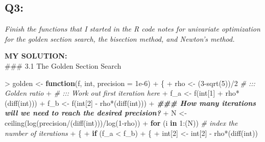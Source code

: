 \documentclass[
]{article}
\newenvironment{Shaded}{\begin{snugshade}}{\end{snugshade}}
\newcommand{\AttributeTok}[1]{\textcolor[rgb]{0.77,0.63,0.00}{#1}}
\newcommand{\CommentTok}[1]{\textcolor[rgb]{0.56,0.35,0.01}{\textit{#1}}}
\newcommand{\ControlFlowTok}[1]{\textcolor[rgb]{0.13,0.29,0.53}{\textbf{#1}}}
\newcommand{\DecValTok}[1]{\textcolor[rgb]{0.00,0.00,0.81}{#1}}
\newcommand{\DocumentationTok}[1]{\textcolor[rgb]{0.56,0.35,0.01}{\textbf{\textit{#1}}}}
\newcommand{\FloatTok}[1]{\textcolor[rgb]{0.00,0.00,0.81}{#1}}
\newcommand{\FunctionTok}[1]{\textcolor[rgb]{0.00,0.00,0.00}{#1}}
\newcommand{\NormalTok}[1]{#1}
\newcommand{\OtherTok}[1]{\textcolor[rgb]{0.56,0.35,0.01}{#1}}
\newcommand{\SpecialCharTok}[1]{\textcolor[rgb]{0.00,0.00,0.00}{#1}}
\begin{document}
\hypertarget{q3}{%
\subsection{Q3:}\label{q3}}

\emph{Finish the functions that I started in the R code notes for
univariate optimization for the golden section search, the bisection
method, and Newton's method.}

\textbf{MY SOLUTION:}\\
\#\#\# 3.1 The Golden Section Search

\begin{Shaded}
\begin{Highlighting}[]
\SpecialCharTok{\textgreater{}}\NormalTok{ golden }\OtherTok{\textless{}{-}} \ControlFlowTok{function}\NormalTok{(f, int, }\AttributeTok{precision =} \FloatTok{1e{-}6}\NormalTok{)}
\SpecialCharTok{+}\NormalTok{ \{}
\SpecialCharTok{+}\NormalTok{   rho }\OtherTok{\textless{}{-}}\NormalTok{ (}\DecValTok{3}\SpecialCharTok{{-}}\FunctionTok{sqrt}\NormalTok{(}\DecValTok{5}\NormalTok{))}\SpecialCharTok{/}\DecValTok{2} \CommentTok{\# ::: Golden ratio}
\SpecialCharTok{+}   \CommentTok{\# ::: Work out first iteration here}
\SpecialCharTok{+}\NormalTok{   f\_a }\OtherTok{\textless{}{-}} \FunctionTok{f}\NormalTok{(int[}\DecValTok{1}\NormalTok{] }\SpecialCharTok{+}\NormalTok{ rho}\SpecialCharTok{*}\NormalTok{(}\FunctionTok{diff}\NormalTok{(int)))}
\SpecialCharTok{+}\NormalTok{   f\_b }\OtherTok{\textless{}{-}} \FunctionTok{f}\NormalTok{(int[}\DecValTok{2}\NormalTok{] }\SpecialCharTok{{-}}\NormalTok{ rho}\SpecialCharTok{*}\NormalTok{(}\FunctionTok{diff}\NormalTok{(int)))}
\SpecialCharTok{+}   \DocumentationTok{\#\#\# How many iterations will we need to reach the desired precision?}
\SpecialCharTok{+}\NormalTok{   N }\OtherTok{\textless{}{-}} \FunctionTok{ceiling}\NormalTok{(}\FunctionTok{log}\NormalTok{(precision}\SpecialCharTok{/}\NormalTok{(}\FunctionTok{diff}\NormalTok{(int)))}\SpecialCharTok{/}\FunctionTok{log}\NormalTok{(}\DecValTok{1}\SpecialCharTok{{-}}\NormalTok{rho))}
\SpecialCharTok{+}   \ControlFlowTok{for}\NormalTok{ (i }\ControlFlowTok{in} \DecValTok{1}\SpecialCharTok{:}\NormalTok{(N))                    }\CommentTok{\# index the number of iterations}
\SpecialCharTok{+}\NormalTok{   \{}
\SpecialCharTok{+}     \ControlFlowTok{if}\NormalTok{ (f\_a }\SpecialCharTok{\textless{}}\NormalTok{ f\_b)  }
\SpecialCharTok{+}\NormalTok{     \{}
\SpecialCharTok{+}\NormalTok{       int[}\DecValTok{2}\NormalTok{] }\OtherTok{\textless{}{-}}\NormalTok{ int[}\DecValTok{2}\NormalTok{] }\SpecialCharTok{{-}}\NormalTok{ rho}\SpecialCharTok{*}\NormalTok{(}\FunctionTok{diff}\NormalTok{(int))}

\end{Highlighting}
\end{Shaded}
\end{document}
